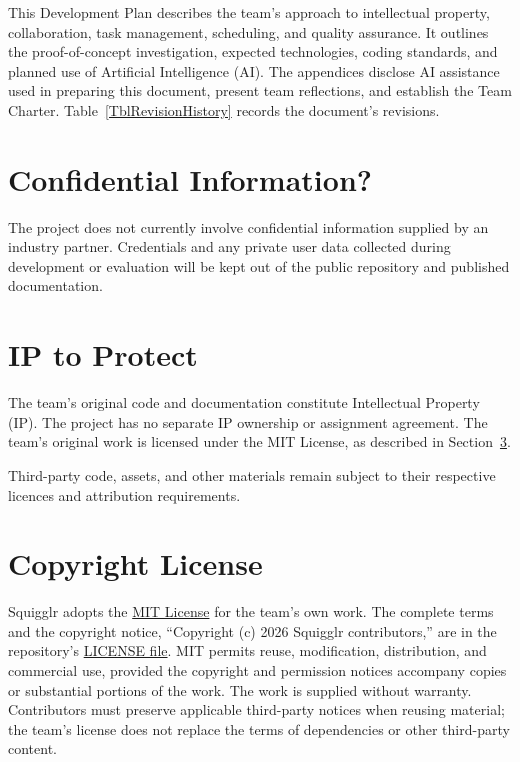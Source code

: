 \documentclass{article}
\begin{document}
\newpage{}

This Development Plan describes the team's approach to intellectual
property, collaboration, task management, scheduling, and quality
assurance. It outlines the proof-of-concept investigation, expected
technologies, coding standards, and planned use of Artificial
Intelligence (AI). The appendices disclose AI assistance used in
preparing this document, present team reflections, and establish
the Team Charter. Table~\ref{TblRevisionHistory} records the
document's revisions.

\section{Confidential Information?}

The project does not currently involve confidential information
supplied by an industry partner. Credentials and any private user
data collected during development or evaluation will be kept out
of the public repository and published documentation.

\section{IP to Protect}

The team's original code and documentation constitute Intellectual
Property (IP). The project has no separate IP ownership or
assignment agreement. The team's original work is licensed under
the MIT License, as described in
Section~\ref{sec:copyright-license}.

Third-party code, assets, and other materials remain subject to
their respective licences and attribution requirements.

\section{Copyright License}
\label{sec:copyright-license}

Squigglr adopts the \href{https://opensource.org/license/mit}{MIT License}
for the team's own work. The complete terms and the copyright notice,
``Copyright (c) 2026 Squigglr contributors,'' are in the repository's
\href{https://github.com/AHMEDELZARIA/squigglr/blob/main/LICENSE}{LICENSE file}.
MIT permits reuse, modification, distribution, and commercial use, provided
the copyright and permission notices accompany copies or substantial portions
of the work. The work is supplied without warranty. Contributors must preserve
applicable third-party notices when reusing material; the team's license does
not replace the terms of dependencies or other third-party content.
\end{document}
